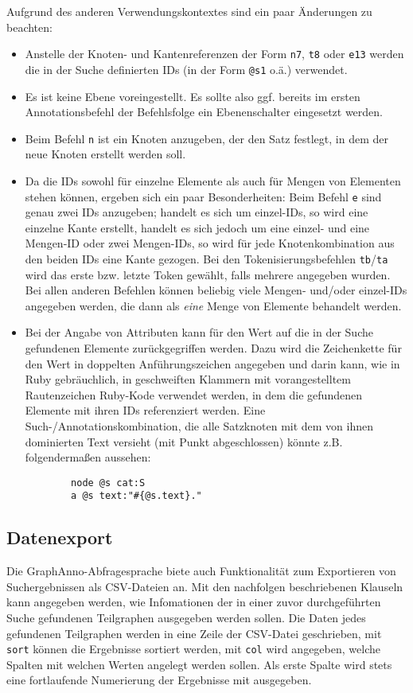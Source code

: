 \documentclass[12pt]{scrartcl}
\begin{document}
{Aufgrund des anderen Verwendungskontextes sind ein paar Änderungen zu beachten:
\begin{itemize}
	\item Anstelle der Knoten- und Kantenreferenzen der Form \texttt{n7}, \texttt{t8} oder \texttt{e13} werden die in der Suche definierten IDs (in der Form \texttt{@s1} o.ä.) verwendet.
	\item Es ist keine Ebene voreingestellt. Es sollte also ggf. bereits im ersten Annotationsbefehl der Befehlsfolge ein Ebenenschalter eingesetzt werden.
	\item Beim Befehl \texttt{n} ist ein Knoten anzugeben, der den Satz festlegt, in dem der neue Knoten erstellt werden soll.
	\item Da die IDs sowohl für einzelne Elemente als auch für Mengen von Elementen stehen können, ergeben sich ein paar Besonderheiten: Beim Befehl \texttt{e} sind genau zwei IDs anzugeben; handelt es sich um einzel-IDs, so wird eine einzelne Kante erstellt, handelt es sich jedoch um eine einzel- und eine Mengen-ID oder zwei Mengen-IDs, so wird für jede Knotenkombination aus den beiden IDs eine Kante gezogen. Bei den Tokenisierungsbefehlen \texttt{tb}/\texttt{ta} wird das erste bzw. letzte Token gewählt, falls mehrere angegeben wurden. Bei allen anderen Befehlen können beliebig viele Mengen- und/oder einzel-IDs angegeben werden, die dann als \textit{eine} Menge von Elemente behandelt werden.
	\item Bei der Angabe von Attributen kann für den Wert auf die in der Suche gefundenen Elemente zurückgegriffen werden. Dazu wird die Zeichenkette für den Wert in doppelten Anführungszeichen angegeben und darin kann, wie in Ruby gebräuchlich, in geschweiften Klammern mit vorangestelltem Rautenzeichen Ruby-Kode verwendet werden, in dem die gefundenen Elemente mit ihren IDs referenziert werden. Eine Such-/Annotationskombination, die alle Satzknoten mit dem von ihnen dominierten Text versieht (mit Punkt abgeschlossen) könnte z.B. folgendermaßen aussehen:
	\begin{verbatim}
		node @s cat:S
		a @s text:"#{@s.text}."
	\end{verbatim}
\end{itemize}



\subsection{Datenexport}

Die GraphAnno-Abfragesprache biete auch Funktionalität zum Exportieren von Suchergebnissen als CSV-Dateien an.
Mit den nachfolgen beschriebenen Klauseln kann angegeben werden, wie Infomationen der in einer zuvor durchgeführten Suche gefundenen Teilgraphen ausgegeben werden sollen.
Die Daten jedes gefundenen Teilgraphen werden in eine Zeile der CSV-Datei geschrieben, mit \texttt{sort} können die Ergebnisse sortiert werden, mit \texttt{col} wird angegeben, welche Spalten mit welchen Werten angelegt werden sollen. Als erste Spalte wird stets eine fortlaufende Numerierung der Ergebnisse mit ausgegeben.

}
\end{document}

